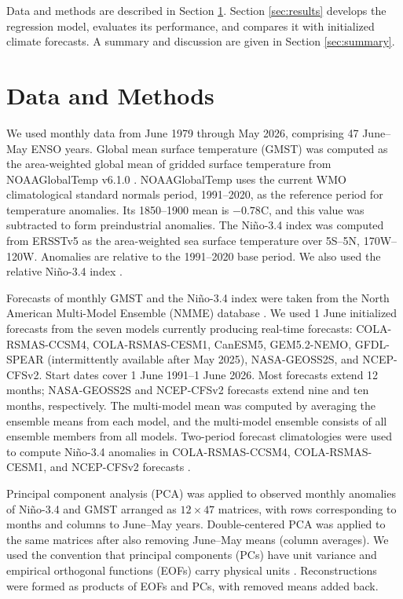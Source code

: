 \documentclass[draft]{agujournal2019}
\begin{document}
Data and methods are described in Section \ref{sec:data-methods}. Section \ref{sec:results} develops the regression model, evaluates its performance, and compares it with initialized climate forecasts. A summary and discussion are given in Section \ref{sec:summary}.

\section{Data and Methods}\label{sec:data-methods}

We used monthly data from June 1979 through May 2026, comprising 47 June--May ENSO years. Global mean surface temperature (GMST) was computed as the area-weighted global mean of gridded surface temperature from NOAAGlobalTemp v6.1.0 \cite{Huang2022improvements}. NOAAGlobalTemp uses the current WMO climatological standard normals period, 1991--2020, as the reference period for temperature anomalies. Its 1850--1900 mean is $-0.78$\textdegree C, and this value was subtracted to form preindustrial anomalies. The Ni\~no-3.4 index was computed from ERSSTv5 \cite{Huang:ERSST5} as the area-weighted sea surface temperature over 5\textdegree S--5\textdegree N, 170\textdegree W--120\textdegree W.  Anomalies are relative to the 1991--2020 base period. We also used the relative Ni\~no-3.4 index \cite{LHeureux2024relative}.

Forecasts of monthly GMST and the Ni\~no-3.4 index were taken from the North American Multi-Model Ensemble (NMME) database \cite{NMME_BAMS,Becker2022decade}. We used 1 June initialized forecasts from the seven models currently producing real-time forecasts: COLA-RSMAS-CCSM4, COLA-RSMAS-CESM1, CanESM5, GEM5.2-NEMO, GFDL-SPEAR (intermittently available after May 2025), NASA-GEOSS2S, and NCEP-CFSv2. Start dates cover 1 June 1991--1 June 2026. Most forecasts extend 12 months; NASA-GEOSS2S and NCEP-CFSv2 forecasts extend nine and ten months, respectively. The multi-model mean was computed by averaging the ensemble means from each model, and the multi-model ensemble consists of all ensemble members from all models. Two-period forecast climatologies were used to compute Ni\~no-3.4 anomalies in COLA-RSMAS-CCSM4, COLA-RSMAS-CESM1, and NCEP-CFSv2 forecasts \cite{Barnston:Det:ENSO}.

Principal component analysis (PCA) was applied to observed monthly anomalies of Ni\~no-3.4 and GMST arranged as $12 \times 47$ matrices, with rows corresponding to months and columns to June--May years. Double-centered PCA was applied to the same matrices after also removing June--May means (column averages). We used the convention that principal components (PCs) have unit variance and empirical orthogonal functions (EOFs) carry physical units \cite{DelsoleTippettBook}. Reconstructions were formed as products of EOFs and PCs, with removed means added back.
\end{document}
